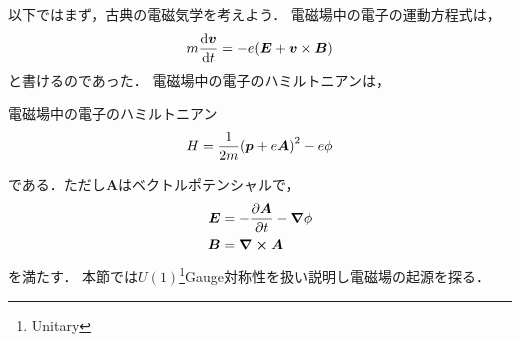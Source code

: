 \documentclass{report}
\begin{document}
  以下ではまず，古典の電磁気学を考えよう．
  電磁場中の電子の運動方程式は，
  \begin{align}
    m\dv{\bm{v}}{t} = -e\qty(\bm{E} + \bm{v}\times\bm{B})
  \end{align}
  と書けるのであった．
  電磁場中の電子のハミルトニアンは，
  \begin{itembox}[l]{電磁場中の電子のハミルトニアン}
    \begin{align}
      H = \frac{1}{2m}\qty(\bm{p} + e\bm{A})^2 - e\phi
    \end{align}
  \end{itembox}
  である．ただし$\bm{A}$はベクトルポテンシャルで，
  \begin{align}
    \bm{E} &= -\pdv{\bm{A}}{t} - \grad\phi \\ 
    \bm{B} &= \curl\bm{A}
  \end{align}
  を満たす．
  本節では$U(1)$\footnote{Unitary}Gauge対称性を扱い説明し電磁場の起源を探る．
\end{document}
